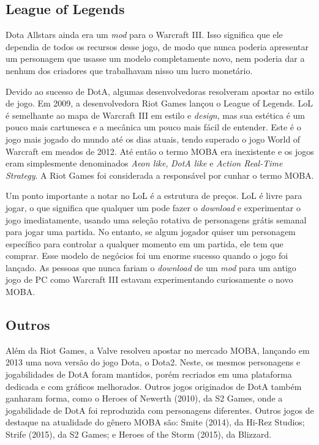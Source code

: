 \subsection{League of Legends}
Dota Allstars ainda era um \textit{mod} para o Warcraft III. Isso significa que ele dependia de todos os recursos desse jogo, de modo que nunca poderia apresentar um personagem que usasse um modelo completamente novo, nem poderia dar a nenhum dos criadores que trabalhavam nisso um lucro monetário.

Devido ao sucesso de DotA, algumas desenvolvedoras resolveram apostar no estilo de jogo. Em 2009, a desenvolvedora Riot Games lançou o League of Legends. LoL é semelhante ao mapa de Warcraft III em estilo e \textit{design}, mas sua estética é um pouco mais cartunesca e a mecânica um pouco mais fácil de entender. Este é o jogo mais jogado do mundo até os dias atuais, tendo superado o jogo World of Warcraft em meados de 2012. Até então o termo MOBA era inexistente e os jogos eram simplesmente denominados \textit{Aeon like}, \textit{DotA like} e \textit{Action Real-Time Strategy}. A Riot Games foi considerada a responsável por cunhar o termo MOBA.

Um ponto importante a notar no LoL é a estrutura de preços. LoL é livre para jogar, o que significa que qualquer um pode fazer o \textit{download} e experimentar o jogo imediatamente, usando uma seleção rotativa de personagens grátis semanal para jogar uma partida. No entanto, se algum jogador quiser um personagem específico para controlar a qualquer momento em um partida, ele tem que comprar. Esse modelo de negócios foi um enorme sucesso quando o jogo foi lançado. As pessoas que nunca fariam o \textit{download} de um \textit{mod} para um antigo jogo de PC como Warcraft III estavam experimentando curiosamente o novo MOBA.

\subsection{Outros}
Além da Riot Games, a Valve resolveu apostar no mercado MOBA, lançando em 2013 uma nova versão do jogo Dota, o Dota2. Neste, os mesmos personagens e jogabilidades de DotA foram mantidos, porém recriados em uma plataforma dedicada e com gráficos melhorados. Outros jogos originados de DotA também ganharam forma, como o Heroes of Newerth (2010), da S2 Games, onde a jogabilidade de DotA foi reproduzida com personagens diferentes. Outros jogos de destaque na atualidade do gênero MOBA são: Smite (2014), da Hi-Rez Studios; Strife (2015), da S2 Games; e Heroes of the Storm (2015), da Blizzard.

